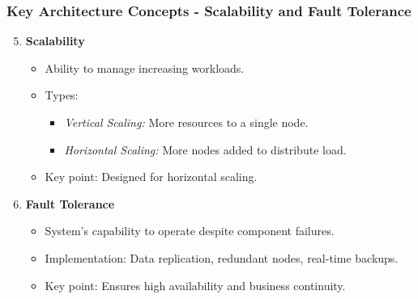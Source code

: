 \documentclass[aspectratio=169]{beamer}
\begin{document}
\begin{frame}[fragile]
  \frametitle{Key Architecture Concepts - Scalability and Fault Tolerance}
  \begin{enumerate}
    \setcounter{enumi}{4} %
    \item \textbf{Scalability}
      \begin{itemize}
        \item Ability to manage increasing workloads.
        \item Types:
          \begin{itemize}
            \item \textit{Vertical Scaling:} More resources to a single node.
            \item \textit{Horizontal Scaling:} More nodes added to distribute load.
          \end{itemize}
        \item Key point: Designed for horizontal scaling.
      \end{itemize}
    
    \item \textbf{Fault Tolerance}
      \begin{itemize}
        \item System's capability to operate despite component failures.
        \item Implementation: Data replication, redundant nodes, real-time backups.
        \item Key point: Ensures high availability and business continuity.
      \end{itemize}
  \end{enumerate}
\end{frame}
\end{document}
